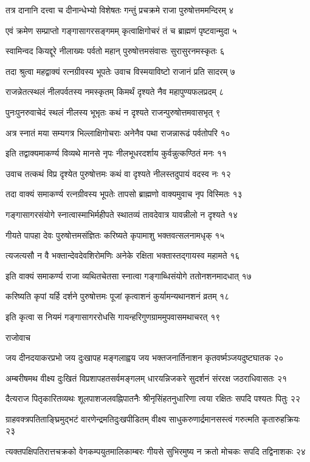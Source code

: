 तत्र दानानि दत्त्वा च दीनान्धेभ्यो विशेषतः
गन्तुं प्रचक्रमे राजा पुरुषोत्तममन्दिरम् ४

एवं क्रमेण सम्प्राप्तो गङ्गासागरसङ्गमम्
कृत्वाक्षिगोचरं तं च ब्राह्मणं पृष्टवान्मुदा ५

स्वामिन्वद कियद्दूरे नीलाख्यः पर्वतो महान्
पुरुषोत्तमसंवासः सुरासुरनमस्कृतः ६

तदा श्रुत्वा महद्वाक्यं रत्नग्रीवस्य भूपतेः
उवाच विस्मयाविष्टो राजानं प्रति सादरम् ७

राजन्नेतत्स्थलं नीलपर्वतस्य नमस्कृतम्
किमर्थं दृश्यते नैव महापुण्यफलप्रदम् ८

पुनःपुनरुवाचेदं स्थलं नीलस्य भूभृतः
कथं न दृश्यते राजन्पुरुषोत्तमवासभृत् ९

अत्र स्नातं मया सम्यगत्र भिल्लाक्षिगोचराः
अनेनैव पथा राजन्नारूढं पर्वतोपरि १०

इति तद्वाक्यमाकर्ण्य विव्यथे मानसे नृपः
नीलभूधरदर्शाय कुर्वन्नुत्कण्ठितं मनः ११

उवाच तत्कथं विप्र दृश्येत पुरुषोत्तमः
कथं वा दृश्यते नीलस्तदुपायं वदस्व नः १२

तदा वाक्यं समाकर्ण्य रत्नग्रीवस्य भूपतेः
तापसो ब्राह्मणो वाक्यमुवाच नृप विस्मितः १३

गङ्गासागरसंयोगे स्नात्वास्माभिर्महीपते
स्थातव्यं तावदेवात्र यावन्नीलो न दृश्यते १४

गीयते पापहा देवः पुरुषोत्तमसंज्ञितः
करिष्यते कृपामाशु भक्तवत्सलनामधृक् १५

त्यजत्यसौ न वै भक्तान्देवदेवशिरोमणिः
अनेके रक्षिता भक्तास्तद्गायस्व महामते १६

इति वाक्यं समाकर्ण्य राजा व्यथितचेतसा
स्नात्वा गङ्गाब्धिसंयोगे ततोनशनमादधात् १७

करिष्यति कृपां यर्हि दर्शने पुरुषोत्तमः
पूजां कृत्वाशनं कुर्यामन्यथानशनं व्रतम् १८

इति कृत्वा स नियमं गङ्गासागररोधसि
गायन्हरिगुणग्राममुपवासमथाचरत् १९

राजोवाच

जय दीनदयाकरप्रभो जय दुःखापह मङ्गलाह्वय
जय भक्तजनार्तिनाशन कृतवर्ष्मञ्जयदुष्टघातक २०

अम्बरीषमथ वीक्ष्य दुःखितं विप्रशापहतसर्वमङ्गलम्
धारयन्निजकरे सुदर्शनं संररक्ष जठराधिवासतः २१

दैत्यराज पितृकारितव्यथः शूलपाशजलवह्निपातनैः
श्रीनृसिंहतनुधारिणा त्वया रक्षितः सपदि पश्यतः पितुः २२

ग्राहवक्त्रपतिताङ्घ्रिमुद्भटं वारणेन्द्रमतिदुःखपीडितम्
वीक्ष्य साधुकरुणार्द्रमानसस्त्वं गरुत्मति कृतारुहक्रियः २३

त्यक्तपक्षिपतिरात्तचक्रको वेगकम्पयुतमालिकाम्बरः
गीयसे सुभिरमुष्य न क्रतो मोचकः सपदि तद्विनाशकः २४

